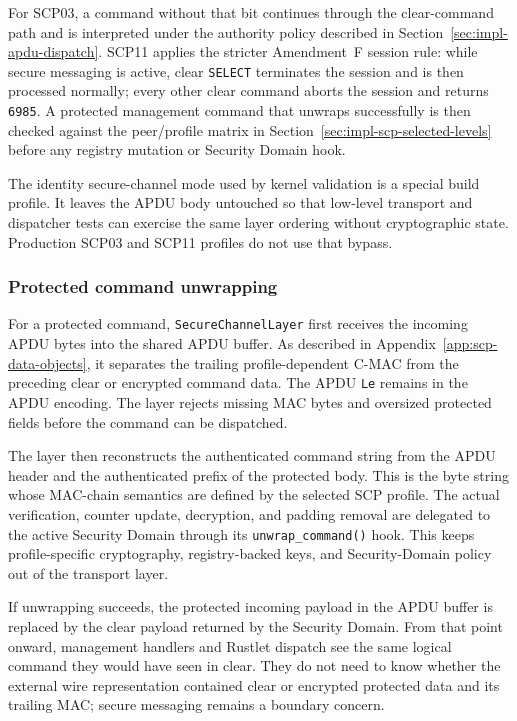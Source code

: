 For SCP03, a command without that bit continues through the clear-command path
and is interpreted under the authority policy described in
Section~\ref{sec:impl-apdu-dispatch}. SCP11 applies the stricter Amendment~F
session rule: while secure messaging is active, clear \texttt{SELECT}
terminates the session and is then processed normally; every other clear
command aborts the session and returns \texttt{6985}. A protected management
command that unwraps successfully is then checked against the peer/profile
matrix in Section~\ref{sec:impl-scp-selected-levels} before any registry
mutation or Security Domain hook.

The identity secure-channel mode used by kernel validation is a special build
profile. It leaves the APDU body untouched so that low-level transport and
dispatcher tests can exercise the same layer ordering without cryptographic
state. Production SCP03 and SCP11 profiles do not use that bypass.

\subsubsection{Protected command unwrapping}

For a protected command, \texttt{SecureChannelLayer} first receives the
incoming APDU bytes into the shared APDU buffer. As described in
Appendix~\ref{app:scp-data-objects}, it separates the trailing
profile-dependent C-MAC from the preceding clear or encrypted command data.
The APDU \texttt{Le} remains in the APDU encoding. The layer rejects missing
MAC bytes and oversized protected fields before the command can be dispatched.

The layer then reconstructs the authenticated command string from the APDU
header and the authenticated prefix of the protected body. This is the byte
string whose MAC-chain semantics are defined by the selected SCP profile. The
actual verification, counter update, decryption, and padding removal are
delegated to the active Security Domain through its
\texttt{unwrap\_command()} hook. This keeps profile-specific cryptography,
registry-backed keys, and Security-Domain policy out of the transport layer.

If unwrapping succeeds, the protected incoming payload in the APDU buffer is
replaced by the clear payload returned by the Security Domain. From that point
onward, management handlers and Rustlet dispatch see the same logical command
they would have seen in clear. They do not need to know whether the external
wire representation contained clear or encrypted protected data and its
trailing MAC; secure messaging remains a boundary concern.

